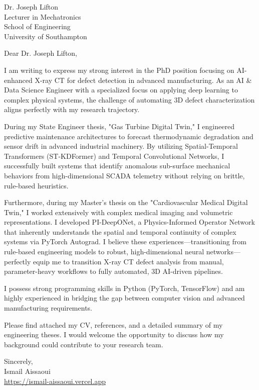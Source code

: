 \documentclass[11pt, a4paper]{letter}
\begin{document}
\begin{letter}{Dr. Joseph Lifton \\ Lecturer in Mechatronics \\ School of Engineering \\ University of Southampton}
\opening{Dear Dr. Joseph Lifton,}

I am writing to express my strong interest in the PhD position focusing on AI-enhanced X-ray CT for defect detection in advanced manufacturing. As an AI \& Data Science Engineer with a specialized focus on applying deep learning to complex physical systems, the challenge of automating 3D defect characterization aligns perfectly with my research trajectory.

During my State Engineer thesis, "Gas Turbine Digital Twin," I engineered predictive maintenance architectures to forecast thermodynamic degradation and sensor drift in advanced industrial machinery. By utilizing Spatial-Temporal Transformers (ST-KDFormer) and Temporal Convolutional Networks, I successfully built systems that identify anomalous sub-surface mechanical behaviors from high-dimensional SCADA telemetry without relying on brittle, rule-based heuristics. 

Furthermore, during my Master's thesis on the "Cardiovascular Medical Digital Twin," I worked extensively with complex medical imaging and volumetric representations. I developed PI-DeepONet, a Physics-Informed Operator Network that inherently understands the spatial and temporal continuity of complex systems via PyTorch Autograd. I believe these experiences—transitioning from rule-based engineering models to robust, high-dimensional neural networks—perfectly equip me to transition X-ray CT defect analysis from manual, parameter-heavy workflows to fully automated, 3D AI-driven pipelines.

I possess strong programming skills in Python (PyTorch, TensorFlow) and am highly experienced in bridging the gap between computer vision and advanced manufacturing requirements. 

Please find attached my CV, references, and a detailed summary of my engineering theses. I would welcome the opportunity to discuss how my background could contribute to your research team.

\closing{Sincerely, \\ Ismail Aissaoui \\ \href{https://ismail-aissaoui.vercel.app}{https://ismail-aissaoui.vercel.app}}
\end{letter}
\end{document}
